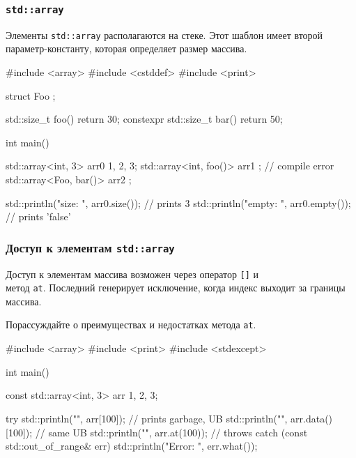 \documentclass[compress, 8pt, aspectratio=169]{beamer}
\begin{document}
  \begin{frame}[fragile]

    \frametitle{\texttt{std::array}}

    Элементы \texttt{std::array}\footnotemark{} располагаются на стеке.
    Этот шаблон имеет второй параметр-константу, которая определяет размер
    массива.


    \begin{myinplacelisting}[minted language=cpp]
#include <array>
#include <cstddef>
#include <print>

struct Foo {};

std::size_t foo() { return 30; }
constexpr std::size_t bar() { return 50; }

int main() {
    std::array<int, 3> arr0 {1, 2, 3};
    std::array<int, foo()> arr1 {}; // compile error
    std::array<Foo, bar()> arr2 {};

    std::println("size: {}", arr0.size()); // prints 3
    std::println("empty: {}", arr0.empty()); // prints 'false'
}
    \end{myinplacelisting}

  \end{frame}

  \begin{frame}[fragile]

    \frametitle{Доступ к элементам \texttt{std::array}}

    Доступ к элементам массива возможен через оператор \verb|[]|
    и \\ метод \texttt{at}.
    Последний генерирует исключение, когда индекс выходит
    за границы массива.

    \begin{task}
      Порассуждайте о преимуществах и недостатках метода \texttt{at}.
    \end{task}

    \begin{myinplacelisting}[minted language=cpp]
#include <array>
#include <print>
#include <stdexcept>

int main() {
    const std::array<int, 3> arr {1, 2, 3};

    try {
        std::println("{}", arr[100]); // prints garbage, UB
        std::println("{}", arr.data()[100]); // same UB
        std::println("{}", arr.at(100)); // throws
    }
    catch (const std::out_of_range& err) {
        std::println("Error: {}", err.what());
    }
}
    \end{myinplacelisting}

  \end{frame}
\end{document}
